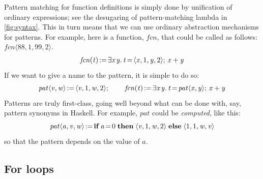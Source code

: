 \documentclass[acmsmall]{acmart}
\newcommand{\Varid}[1]{\mathit{#1}}
\begin{document}
Pattern matching for function definitions is simply done by unification of ordinary expressions;
see the desugaring of pattern-matching lambda in \cref{fig:syntax}.
This in turn means that we can use ordinary abstraction mechanisms for patterns.
For example, here is a function, \ensuremath{\Varid{fcn}}, that could be called as follows: \ensuremath{\Varid{fcn}\langle\mathrm{88},\mathrm{1},\mathrm{99},\mathrm{2}\rangle}.
$$
\begin{array}{l}
\ensuremath{\Varid{fcn}(\Varid{t})\hspace{-0.14em}:=\hspace{-0.14em}\exists\Varid{x}\hspace{0.1em}\Varid{y}.\,\Varid{t}\hspace{-0.14em}=\hspace{-0.14em}\langle{}\Varid{x},\mathrm{1},\Varid{y},\mathrm{2}\rangle;\,\Varid{x}\mathbin{+}\Varid{y}}
\end{array}
$$
If we want to give a name to the pattern, it is simple to do so:
$$
\ensuremath{\Varid{pat}\langle\Varid{v},\Varid{w}\rangle\hspace{-0.14em}:=\hspace{-0.14em}\langle{}\Varid{v},\mathrm{1},\Varid{w},\mathrm{2}\rangle;\,} \quad \quad
\ensuremath{\Varid{fcn}(\Varid{t})\hspace{-0.14em}:=\hspace{-0.14em}\exists\Varid{x}\hspace{0.1em}\Varid{y}.\,\Varid{t}\hspace{-0.14em}=\hspace{-0.14em}\Varid{pat}\langle\Varid{x},\Varid{y}\rangle;\,\Varid{x}\mathbin{+}\Varid{y}}
$$
Patterns are truly first-class, going well beyond what can be done with, say, pattern synonyms
in Haskell.  For example, \ensuremath{\Varid{pat}} could be \emph{computed}, like this:
$$
\ensuremath{\Varid{pat}\langle\Varid{a},\Varid{v},\Varid{w}\rangle\hspace{-0.14em}:=\hspace{-0.14em}\textbf{if}\;\Varid{a}\hspace{-0.14em}=\hspace{-0.14em}\mathrm{0}\;\textbf{then}\;\langle{}\Varid{v},\mathrm{1},\Varid{w},\mathrm{2}\rangle\;\textbf{else}\;\langle{}\mathrm{1},\mathrm{1},\Varid{w},\Varid{v}\rangle}
$$
so that the pattern depends on the value of \ensuremath{\Varid{a}}.

\subsection{For loops} \label{sec:for}
\end{document}
